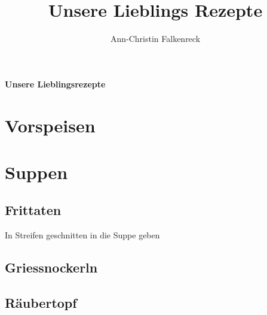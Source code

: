 \documentclass[ngerman,11pt,parskip=half,a5paper,twoside]{scrbook}
\author{Ann-Christin Falkenreck}
\title{Unsere Lieblings Rezepte}
\begin{document}
	\begin{titlepage}
		
	\vspace* {7cm}
		
	\begin{center}
		{\bfseries\huge Unsere Lieblingsrezepte }
	\end{center}
	
		
		

	\end{titlepage}
	
\tableofcontents

	
\chapter{Vorspeisen}

\clearpage
		
\chapter{Suppen}	

\clearpage

	\section{Frittaten} 
	 
	In Streifen geschnitten in die Suppe geben
	\clearpage
	
	\section{Griessnockerln} 
	 
	\clearpage
	
	\section{Räubertopf} 
	 
	\clearpage
	
\end{document}
